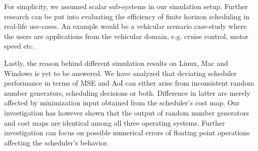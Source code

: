 For simplicity, we assumed scalar sub-systems in our simulation setup. Further
research can be put into evaluating the efficiency of finite horizon scheduling
in real-life use-cases. An example would be a vehicular scenario case-study
where the users are applications from the vehicular domain, e.g. cruise control,
motor speed etc. 

Lastly, the reason behind different simulation results on Linux, Mac and Windows
is yet to be answered. We have analyzed that deviating scheduler performance in
terms of MSE and AoI can either arise from inconsistent random number
generators, scheduling decisions or both. Difference in latter are merely
affected by minimization input obtained from the scheduler's cost map. Our
investigation has however shown that the output of random number generators and
cost maps are identical among all three operating systems. Further investigation
can focus on possible numerical errors of floating point operations affecting
the scheduler's behavior.

